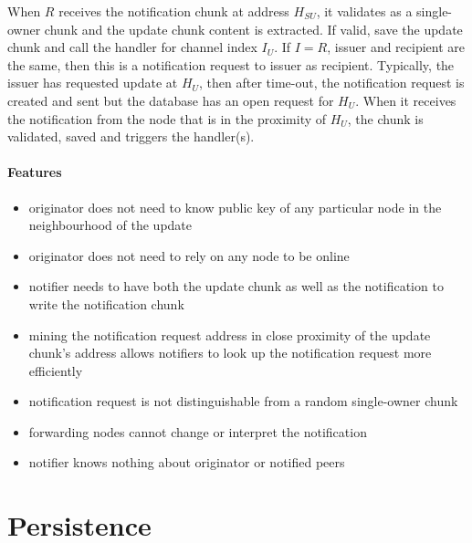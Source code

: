 When $R$ receives the notification chunk at address $H_{SU}$, it validates as a single-owner chunk and the update chunk content is extracted. If valid, save the update chunk and call the handler for channel index $I_U$.
If $I=R$, issuer and recipient are the same, then this is a notification request to issuer as recipient.
Typically, the issuer has requested update at $H_U$, then after time-out, the notification request is created and sent but the database has an open request for $H_U$. When it receives the notification from the node that is in the proximity of $H_U$, the chunk is validated, saved and triggers the handler(s).


\subsubsection{Features}

\begin{itemize}
    \item originator does not need to know public key of any particular node in the neighbourhood of the update
    \item originator does not need to rely on any node to be online
    \item notifier needs to have both the update chunk as well as the notification to write the notification chunk
    \item mining the notification request address in close proximity of the update chunk's address allows notifiers to look up the notification request more efficiently
    \item notification request is not distinguishable from a random single-owner chunk
    \item forwarding nodes cannot change or interpret the notification 
    \item notifier knows nothing about originator or notified peers
\end{itemize}





\chapter{Persistence}\label{sec:persistence}


